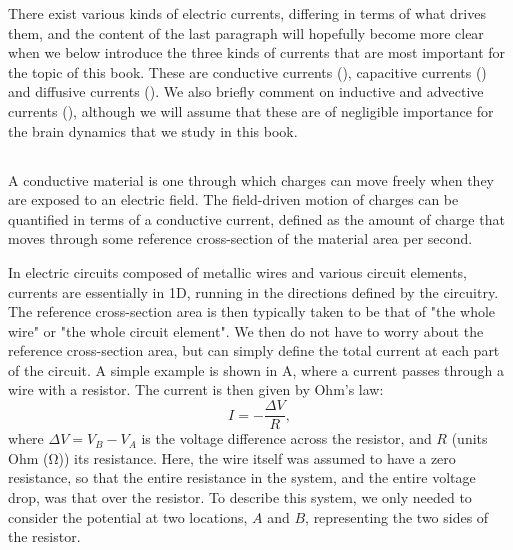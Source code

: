 There exist various kinds of electric currents, differing in terms of what drives them, and the content of the last paragraph will hopefully become more clear when we below introduce the three kinds of currents that are most important for the topic of this book. These are conductive currents (), capacitive currents () and diffusive currents (). We also briefly comment on inductive and advective currents (), although we will assume that these are of negligible importance for the brain dynamics that we study in this book. 


\subsection{}
\label{sec:Basics:ConductiveCurrent}
A conductive material  is one through which charges can move freely when they are exposed to an electric field. The field-driven motion of charges can be quantified in terms of a conductive current, defined as the amount of charge that moves through some reference cross-section of the material area per second.

In electric circuits composed of metallic wires and various circuit elements, currents are essentially in 1D, running in the directions defined by the circuitry. The reference cross-section area is then typically taken to be that of "the whole wire" or "the whole circuit element". We then do not have to worry about the reference cross-section area, but can simply define the total current at each part of the circuit. A simple example is shown in A, where a current passes through a wire with a resistor. The current is then given by Ohm's law:
\begin{equation}
I = - \frac{\Delta V}{R},
\label{eq:Basics:Ohm_R}
\end{equation}
where $\Delta V = V_B-V_A$ is the voltage difference across the resistor, and $R$ (units Ohm (\si{\ohm})) its resistance. Here, the wire itself was assumed to have a zero resistance, 
so that the entire resistance in the system, and the entire voltage drop, was that over the resistor. To describe this system, we only needed to consider the potential at two locations, $A$ and $B$, representing the two sides of the resistor.

